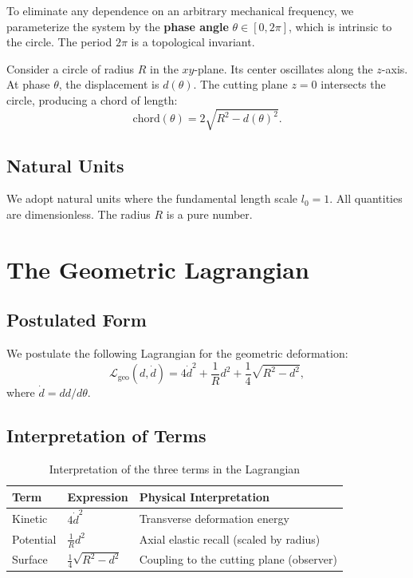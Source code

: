\documentclass[12pt]{article}
\begin{document}
To eliminate any dependence on an arbitrary mechanical frequency, we parameterize the system by the \textbf{phase angle} $\theta \in [0, 2\pi]$, which is intrinsic to the circle. The period $2\pi$ is a topological invariant.

Consider a circle of radius $R$ in the $xy$-plane. Its center oscillates along the $z$-axis. At phase $\theta$, the displacement is $d(\theta)$. The cutting plane $z=0$ intersects the circle, producing a chord of length:
\[
\text{chord}(\theta) = 2\sqrt{R^2 - d(\theta)^2}.
\]

\subsection{Natural Units}

We adopt natural units where the fundamental length scale $l_0 = 1$. All quantities are dimensionless. The radius $R$ is a pure number.

\section{The Geometric Lagrangian}

\subsection{Postulated Form}

We postulate the following Lagrangian for the geometric deformation:
\[
\boxed{\mathcal{L}_{\text{geo}}(d, \dot{d}) = 4\dot{d}^2 + \frac{1}{R}d^2 + \frac{1}{4}\sqrt{R^2 - d^2}},
\]
where $\dot{d} = dd/d\theta$.

\subsection{Interpretation of Terms}

\begin{table}[h]
\centering
\caption{Interpretation of the three terms in the Lagrangian}
\label{tab:terms}
\begin{tabular}{lll}
\toprule
\textbf{Term} & \textbf{Expression} & \textbf{Physical Interpretation} \\
\midrule
Kinetic & $4\dot{d}^2$ & Transverse deformation energy \\
Potential & $\frac{1}{R}d^2$ & Axial elastic recall (scaled by radius) \\
Surface & $\frac{1}{4}\sqrt{R^2-d^2}$ & Coupling to the cutting plane (observer) \\
\bottomrule
\end{tabular}
\end{table}
\end{document}
